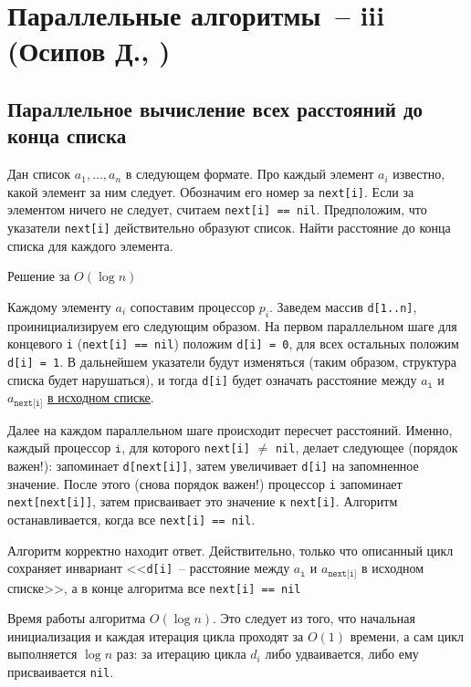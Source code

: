 \section{Параллельные алгоритмы~-- iii (Осипов Д., \groth)}
\subsection{Параллельное вычисление всех расстояний до конца списка}
\begin{problem*}
Дан список $a_1, \ldots, a_n$  в следующем формате. Про каждый элемент $a_i$ известно, какой элемент за ним следует. Обозначим его номер за \texttt{next[i]}. Если за элементом ничего не следует, считаем \texttt{next[i] == nil}. Предположим, что указатели \texttt{next[i]} действительно образуют список. Найти расстояние до конца списка для каждого элемента.
\end{problem*}
\begin{algodescription}{Решение за $O(\log n)$}

Каждому элементу $a_i$ сопоставим процессор $p_i$. Заведем массив \texttt{d[1..n]}, проинициализируем его следующим образом. На первом параллельном шаге для концевого \texttt{i} (\texttt{next[i] == nil}) положим \texttt{d[i] = 0}, для всех остальных положим \texttt{d[i] = 1}. В дальнейшем указатели будут изменяться (таким образом, структура списка будет нарушаться), и тогда \texttt{d[i]} будет означать расстояние между $a_\texttt{i}$ и $a_{\texttt{next[i]}}$ \underline{в исходном списке}.

Далее на каждом параллельном шаге происходит пересчет расстояний. Именно, каждый процессор $\mathtt i$, для которого \texttt{next[i]} $\neq$ \texttt{nil}, делает следующее (порядок важен!): запоминает \texttt{d[next[i]]}, затем увеличивает \texttt{d[i]} на запомненное значение. После этого (снова порядок важен!) процессор \texttt{i} запоминает \texttt{next[next[i]]}, затем присваивает это значение к \texttt{next[i]}. Алгоритм останавливается, когда все \texttt{next[i] == nil}.

Алгоритм корректно находит ответ. Действительно, только что описанный цикл сохраняет инвариант <<\texttt{d[i]}~-- расстояние между $a_\texttt{i}$ и $a_\texttt{next[i]}$ в исходном списке>>, а в конце алгоритма все \texttt{next[i] == nil}

Время работы алгоритма $O(\log n)$. Это следует из того, что начальная инициализация и каждая итерация цикла проходят за $O(1)$ времени, а сам цикл выполняется $\log n$ раз: за итерацию цикла $d_i$ либо удваивается, либо ему присваивается \texttt{nil}.
\end{algodescription}

